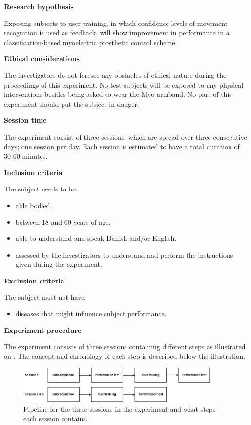 \textbf{Research hypothesis}

Exposing subjects to user training, in which confidence levels of movement recognition is used as feedback, will show improvement in performance in a classification-based myoelectric prosthetic control scheme.%

\textbf{Ethical considerations}  

The investigators do not foresee any obstacles of ethical nature during the proceedings of this experiment. No test subjects will be exposed to any physical interventions besides being asked to wear the Myo armband. No part of this experiment should put the subject in danger. 

\textbf{Session time} 

The experiment consist of three sessions, which are spread over three consecutive days; one session per day. Each session is estimated to have a total duration of 30-60 minutes. 

\textbf{Inclusion criteria}

The subject needs to be:
\begin{itemize}
	\item able bodied.
	\item between 18 and 60 years of age.
	\item able to understand and speak Danish and/or English.
	\item assessed by the investigators to understand and perform the instructions given during the experiment. 
\end{itemize}


\textbf{Exclusion criteria}

The subject must not have:
\begin{itemize}
	\item diseases that might influence subject performance. 
\end{itemize}


\textbf{\Large{Experiment procedure}}

The experiment consists of three sessions containing different steps as illustrated on . The concept and chronology of each step is described below the illustration.


\begin{figure}[H]                                         
	\includegraphics[width=0.9\textwidth]{figures/pMethods/experiment_protocol_pipeline}  
	\caption{Pipeline for the three sessions in the experiment and what steps each session contains.}
	\label{fig:experiment_protocol_pipeline} 
\end{figure}  


